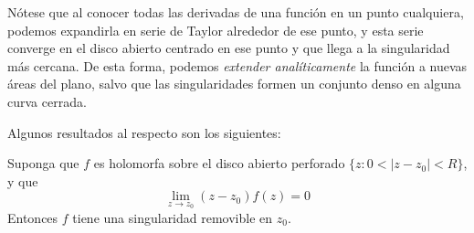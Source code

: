   Nótese que al conocer todas las derivadas de una función
  en un punto cualquiera,
  podemos expandirla en serie de Taylor alrededor de ese punto,
  y esta serie converge en el disco abierto centrado en ese punto
  y que llega a la singularidad más cercana.
  De esta forma,
  podemos \emph{extender analíticamente} la función%
  a nuevas áreas del plano,
  salvo que las singularidades formen un conjunto denso
  en alguna curva cerrada.

  Algunos resultados al respecto son los siguientes:
  \begin{theorem}
    \label{theo:Riemann-removable-singularity}
    Suponga que \(f\) es holomorfa sobre el disco abierto perforado
    \(\{ z \colon 0 < \lvert z - z_0 \rvert < R \}\),
    y que
    \begin{equation*}
      \lim_{z \rightarrow z_0} (z - z_0) f(z)
	= 0
    \end{equation*}
    Entonces \(f\) tiene una singularidad removible en \(z_0\).
  \end{theorem}
